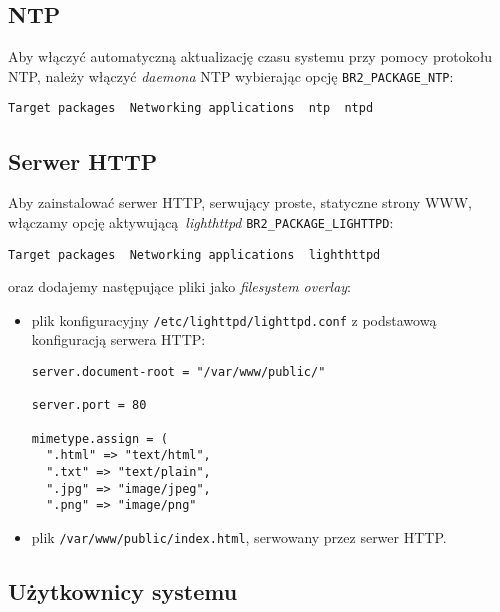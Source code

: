 \documentclass{article}
\begin{document}

\subsection{NTP}

Aby włączyć automatyczną aktualizację czasu systemu przy pomocy protokołu NTP, należy włączyć \emph{daemona} NTP wybierając opcję \texttt{BR2\_PACKAGE\_NTP}:

\begin{center}
\texttt{Target packages \textrightarrow\ Networking applications \textrightarrow\ ntp \textrightarrow\ ntpd}
\end{center}


\subsection{Serwer HTTP}

Aby zainstalować serwer HTTP, serwujący proste, statyczne strony WWW, włączamy opcję aktywującą~\emph{lighthttpd} \texttt{BR2\_PACKAGE\_LIGHTTPD}:

\begin{center}
\texttt{Target packages \textrightarrow\ Networking applications \textrightarrow\ lighthttpd}
\end{center}

oraz dodajemy następujące pliki jako \emph{filesystem overlay}:
\begin{itemize}
\item plik konfiguracyjny \texttt{/etc/lighttpd/lighttpd.conf} z podstawową konfiguracją serwera HTTP:
\begin{Verbatim}[frame=single]
server.document-root = "/var/www/public/"

server.port = 80

mimetype.assign = (
  ".html" => "text/html",
  ".txt" => "text/plain",
  ".jpg" => "image/jpeg",
  ".png" => "image/png"
\end{Verbatim}
\item plik \texttt{/var/www/public/index.html}, serwowany przez serwer HTTP.
\end{itemize}


\subsection{Użytkownicy systemu}
\end{document}
